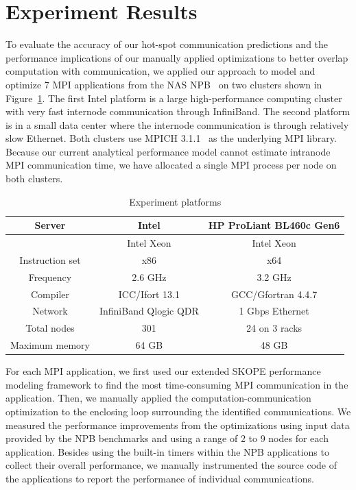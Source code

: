 \section{Experiment Results}
\label{sec-exp}

To evaluate the accuracy of our hot-spot communication predictions and
the performance implications of our manually applied optimizations to
better overlap computation with communication, we applied our approach
to model and optimize 7 MPI applications from the NAS NPB~\cite{npb}
on two clusters shown in Figure~\ref{tab:hw}.  The first Intel
platform is a large high-performance computing cluster with very fast
internode communication through InfiniBand.  The second platform is in
a small data center where the internode communication is through
relatively slow Ethernet.  Both clusters use MPICH 3.1.1~\cite{mpich2}
as the underlying MPI library.  Because our current analytical
performance model cannot estimate intranode MPI communication time, we
have allocated a single MPI process per node on both clusters.

\begin{table}
\caption{Experiment platforms}
\begin{center}
\begin{tabular}{c|c c}
\hline
Server & Intel & HP ProLiant BL460c Gen6 \\
\hline
          &  Intel Xeon & Intel Xeon \\
Instruction set  &  x86 & x64 \\
Frequency &  2.6 GHz & 3.2 GHz \\
Compiler  &  ICC/Ifort 13.1 & GCC/Gfortran 4.4.7 \\
Network   &  InfiniBand Qlogic QDR & 1 Gbps Ethernet \\
Total nodes &  301 & 24 on 3 racks\\
Maximum memory &  64 GB & 48 GB \\
\hline
\hline
\end{tabular}
\end{center}
\label{tab:hw}
\end{table}

For each MPI application, we first used our extended SKOPE performance
modeling framework to find the most time-consuming MPI communication
in the application.  Then, we manually applied the
computation-communication optimization to the enclosing loop
surrounding the identified communications.  We measured the
performance improvements from the optimizations using input data
provided by the NPB benchmarks and using a range of 2 to 9 nodes for
each application.  Besides using the built-in timers within the NPB
applications to collect their overall performance, we manually
instrumented the source code of the applications to report the
performance of individual communications.


